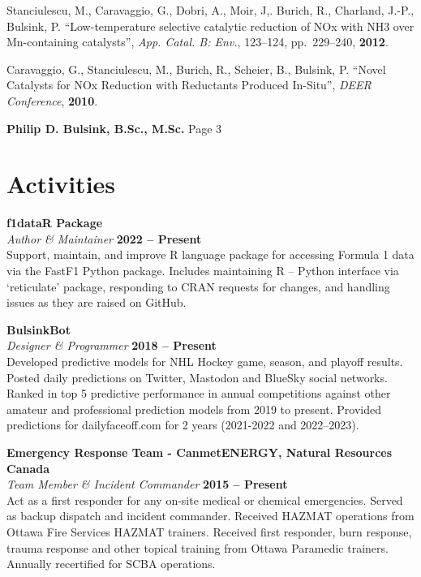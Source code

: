 \documentclass[margin,line]{resumecls}
\begin{document}
\begin{resume}
	\vspace{0mm}
    Stanciulescu, M., Caravaggio, G., Dobri, A., Moir, J,. Burich, R., Charland, J.-P., Bulsink, P. ``Low-temperature selective catalytic reduction of NOx with NH3 over Mn-containing catalysts'', \textit{App. Catal. B: Env.}, 123--124, pp.\ 229--240, \textbf{2012}.

	\vspace{0mm}
    Caravaggio, G., Stanciulescu, M., Burich, R., Scheier, B., Bulsink, P. ``Novel Catalysts for NOx Reduction with Reductants Produced In-Situ'', \textit{DEER Conference}, \textbf{2010}.
\vspace{1mm}

    \newpage
	\textbf{Philip D. Bulsink, B.Sc., M.Sc.} \hfill Page 3 \\
	\vspace{-4mm}
    \section{\mysidestyle Activities}\label{sec:mysidestyle-activities}

    \textbf{f1dataR Package}\\\vspace{1mm}%
    \textsl{Author \& Maintainer} \hfill \textbf{2022 -- Present}\\
    Support, maintain, and improve R language package for accessing Formula 1 data via the FastF1 Python package.
    Includes maintaining R -- Python interface via `reticulate' package, responding to CRAN requests for changes, and handling issues as they are raised on GitHub.

    \textbf{BulsinkBot}\\\vspace{1mm}%
    \textsl{Designer \& Programmer} \hfill \textbf{2018 -- Present}\\
    Developed predictive models for NHL Hockey game, season, and playoff results.
    Posted daily predictions on Twitter, Mastodon and BlueSky social networks.
    Ranked in top 5 predictive performance in annual competitions against other amateur and professional prediction models from 2019 to present.
    Provided predictions for dailyfaceoff.com for 2 years (2021-2022 and 2022--2023).

    \textbf{Emergency Response Team - CanmetENERGY, Natural Resources Canada}\\\vspace{1mm}%
    \textsl{Team Member \& Incident Commander} \hfill \textbf{2015 -- Present}\\
    Act as a first responder for any on-site medical or chemical emergencies.
    Served as backup dispatch and incident commander.
    Received HAZMAT operations from Ottawa Fire Services HAZMAT trainers.
    Received first responder, burn response, trauma response and other topical training from Ottawa Paramedic trainers.
    Annually recertified for SCBA operations.


\end{resume}
\end{document}
